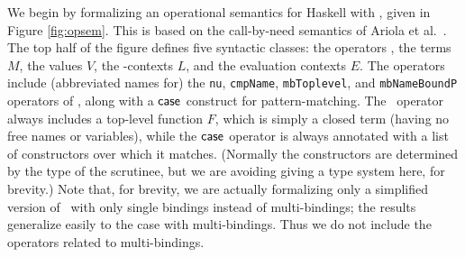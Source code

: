 \documentclass[natbib]{sigplanconf}
\begin{document}
We begin by formalizing an operational semantics for Haskell with
\ourlib, given in Figure \ref{fig:opsem}. This is based on the
call-by-need semantics of Ariola et al.~\cite{ariola95}. The top half
of the figure defines five syntactic classes: the operators \op, the
terms $M$, the values $V$, the -contexts $L$, and the
evaluation contexts $E$. The operators include (abbreviated names for)
the \lstinline{nu}, \lstinline{cmpName}, \lstinline{mbToplevel}, and
\lstinline{mbNameBoundP} operators of \ourlib, along with a $\case[]$
construct for pattern-matching. The \mbTop\ operator always
includes a top-level function $F$, which is simply a closed term
(having no free names or variables), while the $\case[]$ operator is
always annotated with a list of constructors over which it
matches. (Normally the constructors are determined by the type of the
scrutinee, but we are avoiding giving a type system here, for
brevity.) Note that, for brevity, we are actually formalizing only a
simplified version of \ourlib\ with only single bindings instead of
multi-bindings; the results generalize easily to the case with
multi-bindings. Thus we do not include the operators related to
multi-bindings.
\end{document}
